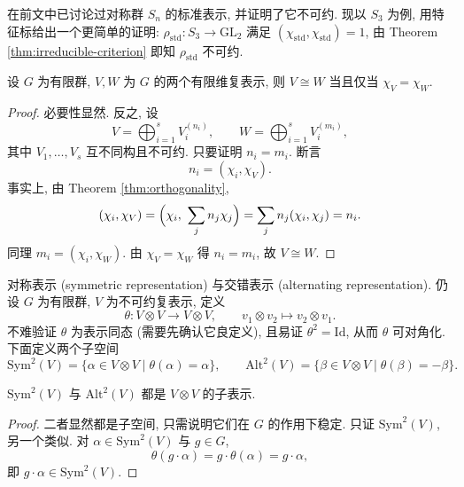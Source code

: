 \begin{example}\label{ex:S3-std-irreducible}
在前文中已讨论过对称群 $S_n$ 的标准表示, 并证明了它不可约.
现以 $S_3$ 为例, 用特征标给出一个更简单的证明:
$\rho_{\mathrm{std}}\colon S_3\to\mathrm{GL}_2$ 满足 $(\chi_{\mathrm{std}},\chi_{\mathrm{std}})=1$,
由 Theorem \ref{thm:irreducible-criterion} 即知 $\rho_{\mathrm{std}}$ 不可约.
\end{example}

\begin{theorem}[同构表示的判定]\label{thm:iso-iff-char-finite}
设 $G$ 为有限群, $V,W$ 为 $G$ 的两个有限维复表示, 则 $V\cong W$ 当且仅当
$\chi_V=\chi_W$.
\end{theorem}

\begin{proof}
必要性显然. 反之, 设
\[
  V=\bigoplus_{i=1}^{s}V_i^{(n_i)},\qquad W=\bigoplus_{i=1}^{s}V_i^{(m_i)},
\]
其中 $V_1,\dots,V_s$ 互不同构且不可约. 只要证明 $n_i=m_i$. 断言
\[
  n_i=(\chi_i,\chi_V).
\]
事实上, 由 Theorem \ref{thm:orthogonality},
\[
  (\chi_i,\chi_V)=\Bigl(\chi_i,\ \sum_{j}n_j\chi_j\Bigr)
  =\sum_{j}n_j(\chi_i,\chi_j)=n_i .
\]
同理 $m_i=(\chi_i,\chi_W)$. 由 $\chi_V=\chi_W$ 得 $n_i=m_i$, 故 $V\cong W$.
\end{proof}

\begin{example}\label{ex:sym-alt}
对称表示 (symmetric representation) 与交错表示 (alternating representation).
仍设 $G$ 为有限群, $V$ 为不可约复表示, 定义
\[
  \theta\colon V\otimes V\longrightarrow V\otimes V,\qquad
  v_1\otimes v_2\longmapsto v_2\otimes v_1 .
\]
不难验证 $\theta$ 为表示同态 (需要先确认它良定义), 且易证 $\theta^2=\mathrm{Id}$,
从而 $\theta$ 可对角化. 下面定义两个子空间
\[
  \mathrm{Sym}^2(V)=\{\alpha\in V\otimes V\mid \theta(\alpha)=\alpha\},\qquad
  \mathrm{Alt}^2(V)=\{\beta\in V\otimes V\mid \theta(\beta)=-\beta\}.
\]
\end{example}

\begin{proposition}\label{prop:sym-alt-sub}
$\mathrm{Sym}^2(V)$ 与 $\mathrm{Alt}^2(V)$ 都是 $V\otimes V$ 的子表示.
\end{proposition}

\begin{proof}
二者显然都是子空间, 只需说明它们在 $G$ 的作用下稳定. 只证
$\mathrm{Sym}^2(V)$, 另一个类似. 对 $\alpha\in\mathrm{Sym}^2(V)$ 与 $g\in G$,
\[
  \theta(g\cdot\alpha)=g\cdot\theta(\alpha)=g\cdot\alpha,
\]
即 $g\cdot\alpha\in\mathrm{Sym}^2(V)$.
\end{proof}


